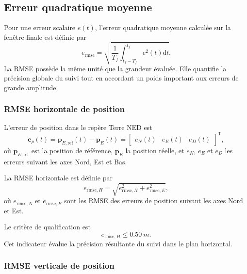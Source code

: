 \documentclass[11pt,a4paper,oneside]{report}
\newcommand{\vect}[1]{\bm{#1}}
\newcommand{\trans}{^{\mathsf T}}
\newcommand{\dd}{\mathrm{d}}
\begin{document}
\subsection{Erreur quadratique moyenne}

Pour une erreur scalaire $e(t)$, l'erreur quadratique moyenne calculée sur la fenêtre finale est définie par
\begin{equation}
	e_{\mathrm{rmse}}
	=
	\sqrt{
		\frac{1}{T_f}
		\int_{t_f-T_f}^{t_f}
		e^2(t)\dd t
	}.
	\label{eq_qualification_rmse}
\end{equation}
La RMSE possède la même unité que la grandeur évaluée. Elle quantifie la précision globale du suivi tout en accordant un poids important aux erreurs de grande amplitude.

\subsubsection{RMSE horizontale de position}

L'erreur de position dans le repère Terre NED est
\begin{equation}
	\vect e_p(t)
	=
	\vect p_{E,\mathrm{ref}}(t)-\vect p_E(t)
	=
	\begin{bmatrix}
		e_N(t) & e_E(t) & e_D(t)
	\end{bmatrix}\trans,
	\label{eq_position_tracking_error}
\end{equation}
où $\vect p_{E,\mathrm{ref}}$ est la position de référence, $\vect p_E$ la position réelle, et $e_N$, $e_E$ et $e_D$ les erreurs suivant les axes Nord, Est et Bas.

La RMSE horizontale est définie par
\begin{equation}
	e_{\mathrm{rmse},H}
	=
	\sqrt{
		e_{\mathrm{rmse},N}^{2}
		+
		e_{\mathrm{rmse},E}^{2}
	},
	\label{eq_qualification_horizontal_rmse}
\end{equation}
où $e_{\mathrm{rmse},N}$ et $e_{\mathrm{rmse},E}$ sont les RMSE des erreurs de position suivant les axes Nord et Est.

Le critère de qualification est
\begin{equation}
	e_{\mathrm{rmse},H}\leq\SI{0.50}{m}.
	\label{eq_horizontal_rmse_requirement}
\end{equation}
Cet indicateur évalue la précision résultante du suivi dans le plan horizontal.

\subsubsection{RMSE verticale de position}
\end{document}
